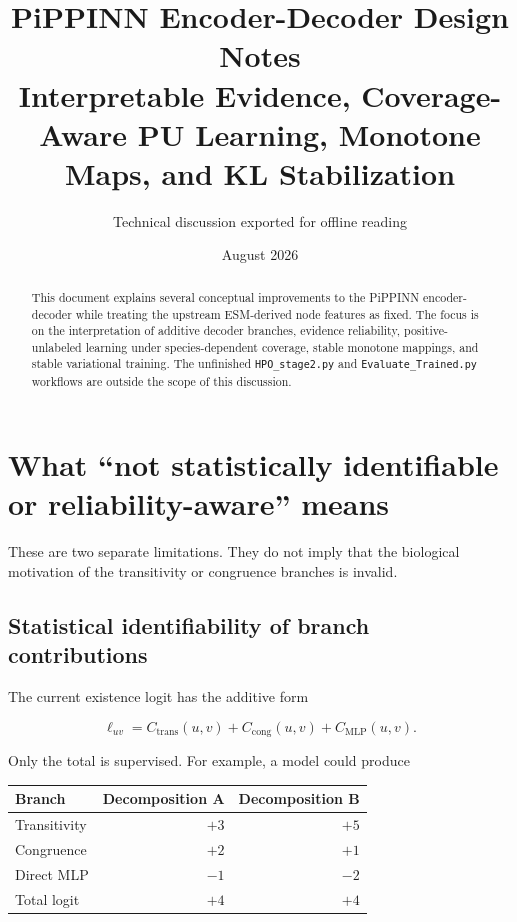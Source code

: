 \documentclass[11pt,a4paper]{article}
\title{\textcolor{accent}{PiPPINN Encoder-Decoder Design Notes}\\
\large Interpretable Evidence, Coverage-Aware PU Learning, Monotone Maps, and KL Stabilization}
\author{Technical discussion exported for offline reading}
\date{August 2026}
\begin{document}
\maketitle
\thispagestyle{fancy}

\begin{abstract}
This document explains several conceptual improvements to the PiPPINN
encoder-decoder while treating the upstream ESM-derived node features as fixed.
The focus is on the interpretation of additive decoder branches, evidence
reliability, positive-unlabeled learning under species-dependent coverage,
stable monotone mappings, and stable variational training. The unfinished
\texttt{HPO\_stage2.py} and \texttt{Evaluate\_Trained.py} workflows are outside
the scope of this discussion.
\end{abstract}

\tableofcontents
\newpage

\section{What ``not statistically identifiable or reliability-aware'' means}

These are two separate limitations. They do not imply that the biological
motivation of the transitivity or congruence branches is invalid.

\subsection{Statistical identifiability of branch contributions}

The current existence logit has the additive form

\begin{equation}
  \ell_{uv}
  = C_{\mathrm{trans}}(u,v)
  + C_{\mathrm{cong}}(u,v)
  + C_{\mathrm{MLP}}(u,v).
\end{equation}

Only the total is supervised. For example, a model could produce

\begin{center}
\begin{tabular}{lrr}
\toprule
Branch & Decomposition A & Decomposition B \\
\midrule
Transitivity & $+3$ & $+5$ \\
Congruence & $+2$ & $+1$ \\
Direct MLP & $-1$ & $-2$ \\
\midrule
Total logit & $+4$ & $+4$ \\
\bottomrule
\end{tabular}
\end{center}
\end{document}
